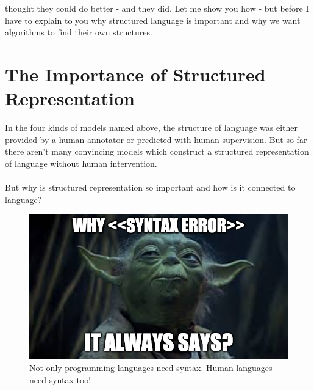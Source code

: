 \documentclass{article}
\begin{document}
\cite{zhang2018} thought they could do better - and they did. Let me show you how - but before I have to explain to you why structured language is important and why we want algorithms to find their own structures.

\section{The Importance of Structured Representation}\label{sec:strucrep}
In the four kinds of models named above, the structure of language was either provided by a human annotator or predicted with human supervision. But so far there aren't many convincing models which construct a structured representation of language without human intervention.\\\\ But why is structured representation so important and how is it connected to language?\\

\begin{figure}[h]
    \centering
    \includegraphics[scale=.4]{syntaxerror.png}
    \caption[Not only programming languages need syntax. Human languages need syntax too!]{Not only programming languages need syntax. Human languages need syntax too!}
    \label{fig:yoda}
\end{figure}
\newpage
\end{document}
